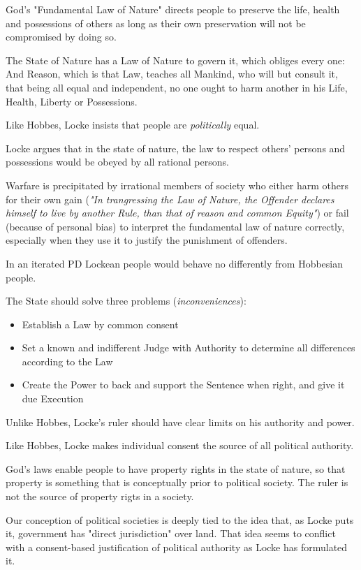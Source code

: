 God's "Fundamental Law of Nature" directs people to preserve the life, health
and possessions of others as long as their own preservation will not be
compromised by doing so.

The State of Nature has a Law of Nature to govern it, which obliges every one:
And Reason, which is that Law, teaches all Mankind, who will but consult it,
that being all equal and independent, no one ought to harm another in his Life,
Health, Liberty or Possessions.

Like Hobbes, Locke insists that people are \textit{politically} equal.

Locke argues that in the state of nature, the law to respect others' persons
and possessions would be obeyed by all rational persons.

Warfare is precipitated by irrational members of society who either harm others
for their own gain (\textit{"In trangressing the Law of Nature, the Offender
declares himself to live by another Rule, than that of reason and common
Equity"}) or fail (because of personal bias) to interpret the fundamental law
of nature correctly, especially when they use it to justify the punishment of
offenders.

In an iterated PD Lockean people would behave no differently from Hobbesian
people.

The State should solve three problems (\textit{inconveniences}):

\begin{itemize}
	\item Establish a Law by common consent
	\item Set a known and indifferent Judge with Authority to determine
	all differences according to the Law
	\item Create the Power to back and support the Sentence when right,
	and give it due Execution
\end{itemize}

Unlike Hobbes, Locke's ruler should have clear limits on his authority and
power.

Like Hobbes, Locke makes individual consent the source of all political
authority.

God's laws enable people to have property rights in the state of nature, so
that property is something that is conceptually prior to political society.
The ruler is not the source of property rigts in a society.

Our conception of political societies is deeply tied to the idea that, as Locke
puts it, government has "direct jurisdiction" over land. That idea seems to
conflict with a consent-based justification of political authority as Locke has
formulated it.
